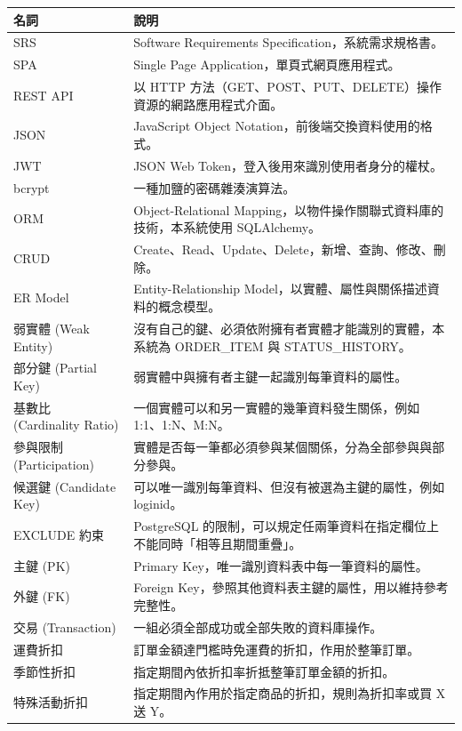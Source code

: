 \documentclass[12pt,a4paper]{article}
\begin{document}
\begin{xltabular}{\linewidth}{|>{\centering\arraybackslash}p{3.4cm}|X|}
\hline{}\textbf{名詞} & \textbf{說明}\\\hline\endhead
SRS & Software Requirements Specification，系統需求規格書。\\\hline
SPA & Single Page Application，單頁式網頁應用程式。\\\hline
REST API & 以 HTTP 方法（GET、POST、PUT、DELETE）操作資源的網路應用程式介面。\\\hline
JSON & JavaScript Object Notation，前後端交換資料使用的格式。\\\hline
JWT & JSON Web Token，登入後用來識別使用者身分的權杖。\\\hline
bcrypt & 一種加鹽的密碼雜湊演算法。\\\hline
ORM & Object-Relational Mapping，以物件操作關聯式資料庫的技術，本系統使用 SQLAlchemy。\\\hline
CRUD & Create、Read、Update、Delete，新增、查詢、修改、刪除。\\\hline
ER Model & Entity-Relationship Model，以實體、屬性與關係描述資料的概念模型。\\\hline
弱實體 (Weak Entity) & 沒有自己的鍵、必須依附擁有者實體才能識別的實體，本系統為 ORDER\_ITEM 與 STATUS\_HISTORY。\\\hline
部分鍵 (Partial Key) & 弱實體中與擁有者主鍵一起識別每筆資料的屬性。\\\hline
基數比 (Cardinality Ratio) & 一個實體可以和另一實體的幾筆資料發生關係，例如 1:1、1:N、M:N。\\\hline
參與限制 (Participation) & 實體是否每一筆都必須參與某個關係，分為全部參與與部分參與。\\\hline
候選鍵 (Candidate Key) & 可以唯一識別每筆資料、但沒有被選為主鍵的屬性，例如 loginid。\\\hline
EXCLUDE 約束 & PostgreSQL 的限制，可以規定任兩筆資料在指定欄位上不能同時「相等且期間重疊」。\\\hline
主鍵 (PK) & Primary Key，唯一識別資料表中每一筆資料的屬性。\\\hline
外鍵 (FK) & Foreign Key，參照其他資料表主鍵的屬性，用以維持參考完整性。\\\hline
交易 (Transaction) & 一組必須全部成功或全部失敗的資料庫操作。\\\hline
運費折扣 & 訂單金額達門檻時免運費的折扣，作用於整筆訂單。\\\hline
季節性折扣 & 指定期間內依折扣率折抵整筆訂單金額的折扣。\\\hline
特殊活動折扣 & 指定期間內作用於指定商品的折扣，規則為折扣率或買 X 送 Y。\\\hline

\end{xltabular}
\end{document}

